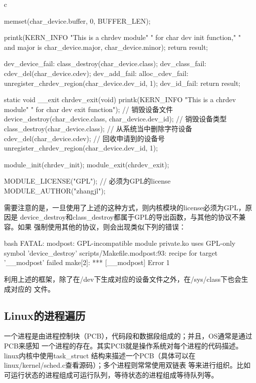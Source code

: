 \begin{code-block}{c}
{        memset(char_device.buffer, 0, BUFFER_LEN);

        printk(KERN_INFO "This is a chrdev module"
                " for char dev init function,"
                " and major is %
                char_device.major, char_device.minor);
        return result;

dev_device_fail:
        class_destroy(char_device.class);
dev_class_fail:
        cdev_del(char_device.cdev);
dev_add_fail:
alloc_cdev_fail:
        unregister_chrdev_region(char_device.dev_id, 1);
dev_id_fail:
        return result;
}

static void __exit chrdev_exit(void)
{
        printk(KERN_INFO
                "This is a chrdev module"
                " for char dev exit function\n");
        // 销毁设备文件
        device_destroy(char_device.class, char_device.dev_id);
        // 销毁设备类型
        class_destroy(char_device.class);
        // 从系统当中删除字符设备
        cdev_del(char_device.cdev);
        // 回收申请到的设备号
        unregister_chrdev_region(char_device.dev_id, 1);
}

module_init(chrdev_init);
module_exit(chrdev_exit);

MODULE_LICENSE("GPL"); // 必须为GPL的license
MODULE_AUTHOR("zhangjl");
\end{code-block}

需要注意的是，一旦使用了上述的这种方式，则内核模块的license必须为GPL，原因是
device\_destroy和class\_destroy都属于GPL的导出函数，与其他的协议不兼容。如果
强制使用其他的协议，则会出现类似下列的错误：
\begin{code-block}{bash}
FATAL: modpost: GPL-incompatible module private.ko uses GPL-only symbol 'device_destroy'
scripts/Makefile.modpost:93: recipe for target '__modpost' failed
make[2]: *** [__modpost] Error 1
\end{code-block}
利用上述的框架，除了在/dev下生成对应的设备文件之外，在/sys/class下也会生成对应的
文件。

\subsection{Linux的进程遍历}
一个进程是由进程控制块（PCB），代码段和数据段组成的；并且，OS通常是通过PCB来感知
一个进程的存在。其实PCB就是操作系统对每个进程的代码描述。linux内核中使用task\_struct
结构来描述一个PCB（具体可以在linux/kernel/sched.c查看源码）；多个进程则常常使用双链表
等来进行组织。比如可运行状态的进程组成可运行队列，等待状态的进程组成等待队列等。

